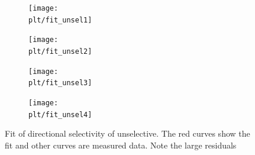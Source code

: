 \documentclass[11pt]{article}
\newcommand{\plt}{../../plots}
\begin{document}
\begin{figure}
    \centering
    \begin{subfigure}{.48\textwidth}
        \centering
        \texttt{[image: \\plt/fit\_unsel1]}
    \end{subfigure}
    \begin{subfigure}{.48\textwidth}
        \centering
        \texttt{[image: \\plt/fit\_unsel2]}
    \end{subfigure}
    \newline
    \begin{subfigure}{.48\textwidth}
        \centering
        \texttt{[image: \\plt/fit\_unsel3]}
    \end{subfigure}
    \begin{subfigure}{.48\textwidth}
        \centering
        \texttt{[image: \\plt/fit\_unsel4]}
    \end{subfigure}
    \caption{Fit of directional selectivity of unselective. The red curves show the fit and other curves are measured data. Note the large residuals}
    \label{fit_unsel}
\end{figure}



\FloatBarrier
\end{document}
